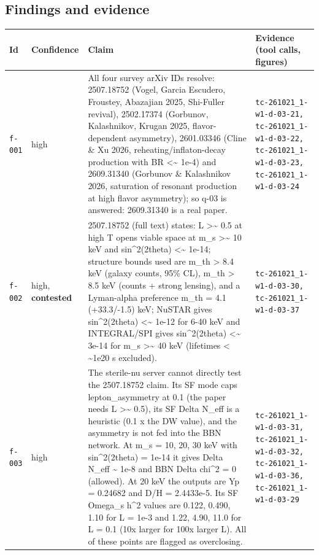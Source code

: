 \documentclass[11pt,a4paper]{article}
\begin{document}
\subsection{Findings and evidence}
\begin{longtable}{@{}p{}p{}p{}p{}@{}}
\toprule Id & Confidence & Claim & Evidence (tool calls, figures) \\ \midrule \endhead
\texttt{f-001} & high & All four survey arXiv IDs resolve: 2507.18752 (Vogel, Garcia Escudero, Froustey, Abazajian 2025, Shi-Fuller revival), 2502.17374 (Gorbunov, Kalashnikov, Krugan 2025, flavor-dependent asymmetry), 2601.03346 (Cline \& Xu 2026, reheating/inflaton-decay production with BR \textless{}\textasciitilde{} 1e-4) and 2609.31340 (Gorbunov \& Kalashnikov 2026, saturation of resonant production at high flavor asymmetry); so q-03 is answered: 2609.31340 is a real paper. & \texttt{tc-261021\_\allowbreak{}1-w1-d-03-21,\allowbreak{} tc-261021\_\allowbreak{}1-w1-d-03-22,\allowbreak{} tc-261021\_\allowbreak{}1-w1-d-03-23,\allowbreak{} tc-261021\_\allowbreak{}1-w1-d-03-24} \\
\texttt{f-002} & high, \textbf{contested} & 2507.18752 (full text) states: L \textgreater{}\textasciitilde{} 0.5 at high T opens viable space at m\_s \textgreater{}\textasciitilde{} 10 keV and sin\textasciicircum{}2(2theta) \textless{}\textasciitilde{} 1e-14; structure bounds used are m\_th \textgreater{} 8.4 keV (galaxy counts, 95\% CL), m\_th \textgreater{} 8.5 keV (counts + strong lensing), and a Lyman-alpha preference m\_th = 4.1 (+33.3/-1.5) keV; NuSTAR gives sin\textasciicircum{}2(2theta) \textless{}\textasciitilde{} 1e-12 for 6-40 keV and INTEGRAL/SPI gives sin\textasciicircum{}2(2theta) \textless{}\textasciitilde{} 3e-14 for m\_s \textgreater{}\textasciitilde{} 40 keV (lifetimes \textless{} \textasciitilde{}1e20 s excluded). & \texttt{tc-261021\_\allowbreak{}1-w1-d-03-30,\allowbreak{} tc-261021\_\allowbreak{}1-w1-d-03-37} \\
\texttt{f-003} & high & The sterile-nu server cannot directly test the 2507.18752 claim. Its SF mode caps lepton\_asymmetry at 0.1 (the paper needs L \textgreater{}\textasciitilde{} 0.5), its SF Delta N\_eff is a heuristic (0.1 x the DW value), and the asymmetry is not fed into the BBN network. At m\_s = 10, 20, 30 keV with sin\textasciicircum{}2(2theta) = 1e-14 it gives Delta N\_eff \textasciitilde{} 1e-8 and BBN Delta chi\textasciicircum{}2 = 0 (allowed). At 20 keV the outputs are Yp = 0.24682 and D/H = 2.4433e-5. Its SF Omega\_s h\textasciicircum{}2 values are 0.122, 0.490, 1.10 for L = 1e-3 and 1.22, 4.90, 11.0 for L = 0.1 (10x larger for 100x larger L). All of these points are flagged as overclosing. & \texttt{tc-261021\_\allowbreak{}1-w1-d-03-31,\allowbreak{} tc-261021\_\allowbreak{}1-w1-d-03-32,\allowbreak{} tc-261021\_\allowbreak{}1-w1-d-03-36,\allowbreak{} tc-261021\_\allowbreak{}1-w1-d-03-29} \\

\end{longtable}
\end{document}
